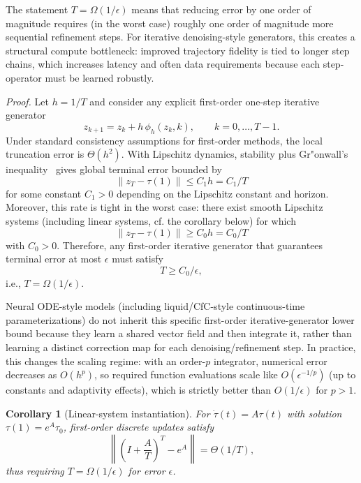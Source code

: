 \documentclass{article}
\newtheorem{corollary}[theorem]{Corollary}
\begin{document}
The statement $T=\Omega(1/\epsilon)$ means that reducing error by one order of magnitude requires (in the worst case) roughly one order of magnitude more sequential refinement steps. For iterative denoising-style generators, this creates a structural compute bottleneck: improved trajectory fidelity is tied to longer step chains, which increases latency and often data requirements because each step-operator must be learned robustly.

\noindent\textit{Proof.} Let $h=1/T$ and consider any explicit first-order one-step iterative generator
\begin{equation}
z_{k+1}=z_k+h\,\phi_h(z_k,k), \qquad k=0,\dots,T-1.
\end{equation}
Under standard consistency assumptions for first-order methods, the local truncation error is $\Theta(h^2)$. With Lipschitz dynamics, stability plus Gr"onwall's inequality~\cite{coddington1956theory} gives global terminal error bounded by
\begin{equation}
\|z_T-\tau(1)\| \le C_1 h = C_1/T
\end{equation}
for some constant $C_1>0$ depending on the Lipschitz constant and horizon. Moreover, this rate is tight in the worst case: there exist smooth Lipschitz systems (including linear systems, cf. the corollary below) for which
\begin{equation}
\|z_T-\tau(1)\| \ge C_0 h = C_0/T
\end{equation}
with $C_0>0$. Therefore, any first-order iterative generator that guarantees terminal error at most $\epsilon$ must satisfy
\begin{equation}
T \ge C_0/\epsilon,
\end{equation}
i.e., $T=\Omega(1/\epsilon)$.

Neural ODE-style models (including liquid/CfC-style continuous-time parameterizations) do not inherit this specific first-order iterative-generator lower bound because they learn a shared vector field and then integrate it, rather than learning a distinct correction map for each denoising/refinement step. In practice, this changes the scaling regime: with an order-$p$ integrator, numerical error decreases as $O(h^p)$, so required function evaluations scale like $O(\epsilon^{-1/p})$ (up to constants and adaptivity effects), which is strictly better than $O(1/\epsilon)$ for $p>1$.

\begin{corollary}[Linear-system instantiation]
For $\dot{\tau}(t)=A\tau(t)$ with solution $\tau(1)=e^A\tau_0$, first-order discrete updates satisfy
\begin{equation}
\left\|\left(I+\frac{A}{T}\right)^T-e^A\right\|=\Theta(1/T),
\end{equation}
thus requiring $T=\Omega(1/\epsilon)$ for error $\epsilon$.
\end{corollary}
\end{document}
